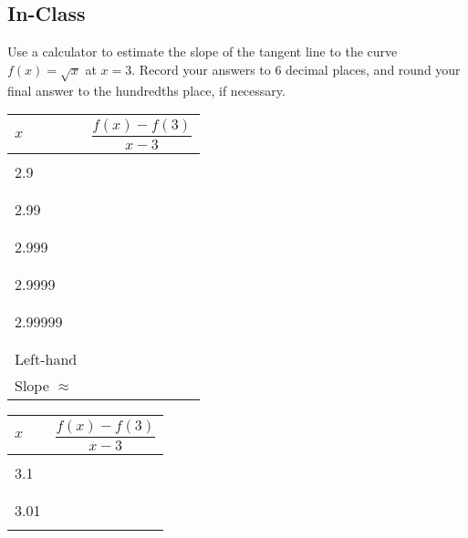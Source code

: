 \documentclass[notes]{subfiles}
\begin{document}
	\subsection*{In-Class}
		\begin{ex}
			Use a calculator to estimate the slope of the tangent line to the curve $f(x) = \sqrt{x}$ at $x = 3$.  Record your answers to 6 decimal places, and round your final answer to the hundredths place, if necessary.\\
		\begin{center}
				\begin{minipage}{.45\textwidth}
					\tabulinesep=1mm
					\begin{tabu}{|X[c]|X[1.5,c]|}\hline
						$x$ 		& $\dfrac{f(x) - f(3)}{x-3}$ \\ \hline
								& \\
						2.9		& \\ 
								& \\ \hline
								& \\
						2.99	& \\
								& \\ \hline 
								& \\
						2.999	& \\ 
								& \\ \hline
								& \\ 
						2.9999	& \\ 
								& \\ \hline
								& \\
						2.99999	&\\
								&\\ \hline\hline
								&\\
						Left-hand		& \\
						Slope $\approx$		&\\ \hline
					\end{tabu}
				\end{minipage}
				\begin{minipage}{.45\textwidth}
					\tabulinesep=1mm
					\begin{tabu}{|X[c]|X[1.5,c]|}\hline
						$x$ 		& $\dfrac{f(x) - f(3)}{x-3}$ \\ \hline
								& \\
						3.1		& \\ 
								& \\ \hline
								& \\
						3.01	& \\
								& \\ \hline 

\end{tabu}
\end{minipage}
\end{center}
\end{ex}
\end{document}
